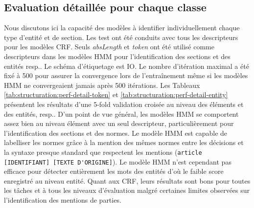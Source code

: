 \subsection{Evaluation détaillée pour chaque classe}
Nous discutons ici la capacité des modèles à identifier individuellement chaque type d'entité et de section. Les test ont été conduits avec tous les descripteurs pour les modèles CRF. Seuls \textit{absLength} et \textit{token} ont été utilisé comme descripteurs dans les modèles HMM pour l'identification des sections et des entités resp.. Le schéma d'étiquetage est IO. Le nombre d'itération maximal a été fixé à 500 pour assurer la convergence lors de l'entraînement même si les modèles HMM ne convergeaient jamais après 500 itérations. Les Tableaux \ref{tab:structuration:perf-detail-token} et \ref{tab:structuration:perf-detail-entity} présentent les résultats d'une 5-fold validation croisée au niveau des éléments et des entités, resp.. D'un point de vue général, les modèles HMM se comportent assez bien au niveau élément avec un seul descripteur, particulièrement pour l'identification des sections et des normes. Le modèle HMM est capable de labelliser les normes grâce à la mention des mêmes normes entre les décisions et la syntaxe presque standard que respectent les mentions (\verb=article [IDENTIFIANT] [TEXTE D'ORIGINE]=). Le modèle HMM n'est cependant pas efficace pour détecter entièrement les mots des entités d'où le faible score enregistré au niveau entité. Quant aux CRF, leurs résultats sont bons pour toutes les tâches et à tous les niveaux d'évaluation malgré certaines limites observées sur l'identification des mentions de parties.

